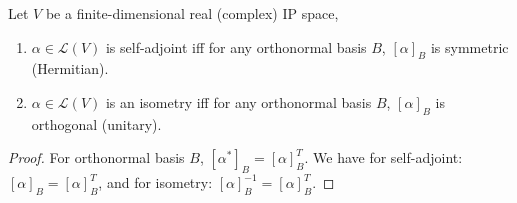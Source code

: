 \documentclass[a4paper]{article}
\begin{document}
\newpage
\begin{lemma}
Let $V$ be a finite-dimensional real (complex) IP space,
\begin{enumerate}
    \item $\alpha\in\mathcal{L}(V)$ is self-adjoint iff for any orthonormal basis $B$, $[\alpha]_B$ is symmetric (Hermitian).
    \item $\alpha\in\mathcal{L}(V)$ is an isometry iff for any orthonormal basis $B$, $[\alpha]_B$ is orthogonal (unitary).
\end{enumerate}
\end{lemma}
\begin{proof}
For orthonormal basis $B$, $[\alpha^*]_B=[\alpha]_B^T$. We have for self-adjoint: $[\alpha]_B=[\alpha]_B^T$, and for isometry: $[\alpha]_B^{-1}=[\alpha]_B^T$.
\end{proof}
\end{document}

